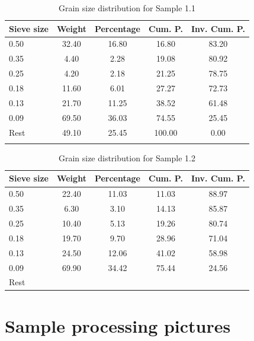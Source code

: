 \begin{table}[H]
    \centering
    \begin{tabular}{lcccc}
    \toprule
    Sieve size & Weight & Percentage & Cum. P. & Inv. Cum. P. \\
    \midrule
    0.50 & 32.40 & 16.80 & 16.80 & 83.20 \\
    0.35 & 4.40 & 2.28 & 19.08 & 80.92 \\
    0.25 & 4.20 & 2.18 & 21.25 & 78.75 \\
    0.18 & 11.60 & 6.01 & 27.27 & 72.73 \\
    0.13 & 21.70 & 11.25 & 38.52 & 61.48 \\
    0.09 & 69.50 & 36.03 & 74.55 & 25.45 \\
    Rest & 49.10 & 25.45 & 100.00 & 0.00 \\
    \bottomrule
    \label{tab:grain_1_1}
    \end{tabular}
    \caption{Grain size distribution for Sample 1.1}
\end{table}

\begin{table}[H]
    \centering
    \begin{tabular}{lcccc}
    \toprule
    Sieve size & Weight & Percentage & Cum. P. & Inv. Cum. P. \\
    \midrule
    0.50 & 22.40 & 11.03 & 11.03 & 88.97 \\
    0.35 & 6.30 & 3.10 & 14.13 & 85.87 \\
    0.25 & 10.40 & 5.13 & 19.26 & 80.74 \\
    0.18 & 19.70 & 9.70 & 28.96 & 71.04 \\   
    0.13 & 24.50 & 12.06 & 41.02 & 58.98 \\
    0.09 & 69.90 & 34.42 & 75.44 & 24.56 \\
    Rest & 
    \bottomrule
    \end{tabular}
    \caption{Grain size distribution for Sample 1.2}
    \label{tab:1.2}
\end{table}

\section{Sample processing pictures}

